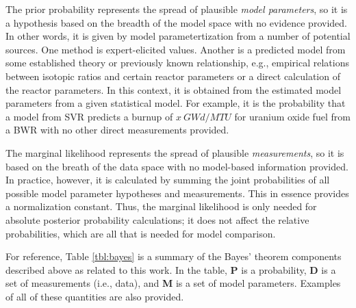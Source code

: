 The prior probability represents the spread of plausible \textit{model
parameters}, so it is a hypothesis based on the breadth of the model space with
no evidence provided.  In other words, it is given by model parametertization
from a number of potential sources.  One method is expert-elicited values.
Another is a predicted model from some established theory or previously known
relationship, e.g., empirical relations between isotopic ratios and certain
reactor parameters or a direct calculation of the reactor parameters. In this
context, it is obtained from the estimated model parameters from a given
statistical model.  For example, it is the probability that a model from
\gls{SVR} predicts a burnup of $x\ GWd/MTU$ for uranium oxide fuel from a
\gls{BWR} with no other direct measurements provided.

The marginal likelihood represents the spread of plausible
\textit{measurements}, so it is based on the breath of the data space with no
model-based information provided.  In practice, however, it is calculated by
summing the joint probabilities of all possible model parameter hypotheses and
measurements. This in essence provides a normalization constant.  Thus, the
marginal likelihood is only needed for absolute posterior probability
calculations; it does not affect the relative probabilities, which are all that
is needed for model comparison. \cite{inverse_theory, bayes_compare}

For reference, Table \ref{tbl:bayes} is a summary of the Bayes' theorem
components described above as related to this work. In the table, \textbf{P} is
a probability, \textbf{D} is a set of measurements (i.e., data), and \textbf{M}
is a set of model parameters. Examples of all of these quantities are also
provided.

